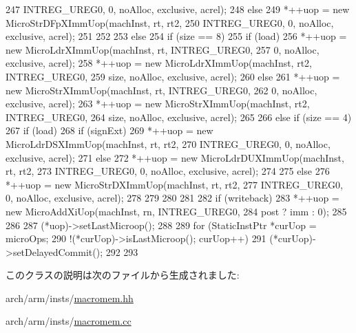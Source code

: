 \begin{DoxyCode}
{{{{247                         INTREG_UREG0, 0, noAlloc, exclusive, acrel);
248             } else {
249                 *++uop = new MicroStrDFpXImmUop(machInst, rt, rt2,
250                         INTREG_UREG0, 0, noAlloc, exclusive, acrel);
251             }
252         }
253     } else {
254         if (size == 8) {
255             if (load) {
256                 *++uop = new MicroLdrXImmUop(machInst, rt, INTREG_UREG0,
257                         0, noAlloc, exclusive, acrel);
258                 *++uop = new MicroLdrXImmUop(machInst, rt2, INTREG_UREG0,
259                         size, noAlloc, exclusive, acrel);
260             } else {
261                 *++uop = new MicroStrXImmUop(machInst, rt, INTREG_UREG0,
262                         0, noAlloc, exclusive, acrel);
263                 *++uop = new MicroStrXImmUop(machInst, rt2, INTREG_UREG0,
264                         size, noAlloc, exclusive, acrel);
265             }
266         } else if (size == 4) {
267             if (load) {
268                 if (signExt) {
269                     *++uop = new MicroLdrDSXImmUop(machInst, rt, rt2,
270                             INTREG_UREG0, 0, noAlloc, exclusive, acrel);
271                 } else {
272                     *++uop = new MicroLdrDUXImmUop(machInst, rt, rt2,
273                             INTREG_UREG0, 0, noAlloc, exclusive, acrel);
274                 }
275             } else {
276                 *++uop = new MicroStrDXImmUop(machInst, rt, rt2,
277                         INTREG_UREG0, 0, noAlloc, exclusive, acrel);
278             }
279         }
280     }
281 
282     if (writeback) {
283         *++uop = new MicroAddXiUop(machInst, rn, INTREG_UREG0,
284                                    post ? imm : 0);
285     }
286 
287     (*uop)->setLastMicroop();
288 
289     for (StaticInstPtr *curUop = microOps;
290             !(*curUop)->isLastMicroop(); curUop++) {
291         (*curUop)->setDelayedCommit();
292     }
293 }

\end{DoxyCode}


このクラスの説明は次のファイルから生成されました:\begin{DoxyCompactItemize}
\item 
arch/arm/insts/\hyperlink{macromem_8hh}{macromem.hh}\item 
arch/arm/insts/\hyperlink{macromem_8cc}{macromem.cc}\end{DoxyCompactItemize}
